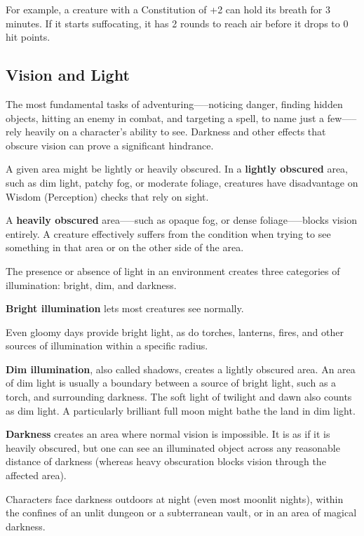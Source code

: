 For example, a creature with a Constitution of +2 can hold its breath for 3 minutes. If it starts suffocating, it has 2 rounds to reach air before it drops to 0 hit points.

\subsection{Vision and Light}

The most fundamental tasks of adventuring—--noticing danger, finding hidden objects, hitting an enemy in combat, and targeting a spell, to name just a few—--rely heavily on a character's ability to see. Darkness and other effects that obscure vision can prove a significant hindrance.

A given area might be lightly or heavily obscured. In a \textbf{lightly obscured} area, such as dim light, patchy fog, or moderate foliage, creatures have disadvantage on Wisdom (Perception) checks that rely on sight.

A \textbf{heavily obscured} area—--such as opaque fog, or dense foliage—--blocks vision entirely. A creature effectively suffers from the  condition when trying to see something in that area or on the other side of the area.

The presence or absence of light in an environment creates three categories of illumination: bright, dim, and darkness.

\textbf{Bright illumination} lets most creatures see normally.

Even gloomy days provide bright light, as do torches, lanterns, fires, and other sources of illumination within a specific radius.

\textbf{Dim illumination}, also called shadows, creates a lightly obscured area. An area of dim light is usually a boundary between a source of bright light, such as a torch, and surrounding darkness. The soft light of twilight and dawn also counts as dim light. A particularly brilliant full moon might bathe the land in dim light.

\textbf{Darkness} creates an area where normal vision is impossible. It is as if it is heavily obscured, but one can see an illuminated object across any reasonable distance of darkness (whereas heavy obscuration blocks vision through the affected area).

Characters face darkness outdoors at night (even most moonlit nights), within the confines of an unlit dungeon or a subterranean vault, or in an area of magical darkness.

